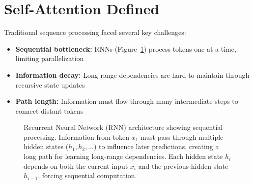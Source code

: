 \section{Self-Attention Defined}
\label{sec:self_attention}

\noindent
Traditional sequence processing faced several key challenges:
\begin{itemize}
    \item \textbf{Sequential bottleneck:} RNNs (Figure~\ref{fig:rnn_architecture}) process tokens one at a time, limiting parallelization
    \item \textbf{Information decay:} Long-range dependencies are hard to maintain through recursive state updates
    \item \textbf{Path length:} Information must flow through many intermediate steps to connect distant tokens
\end{itemize}

\begin{figure}[h]
\centering
{}
\caption{Recurrent Neural Network (RNN) architecture showing sequential processing. Information from token $x_1$ must pass through multiple hidden states ($h_1, h_2, ...$) to influence later predictions, creating a long path for learning long-range dependencies. Each hidden state $h_i$ depends on both the current input $x_i$ and the previous hidden state $h_{i-1}$, forcing sequential computation.}
\label{fig:rnn_architecture}
\end{figure}

